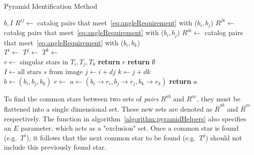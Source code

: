 \begin{algorithm}
    \caption{Pyramid Identification Method} \label{algorithm:pyramidIdentification}
    \begin{algorithmic}[1]
         {$b, I$}
        \State $R^{ij} \gets$ catalog pairs that meet~\eqref{eq:angleRequirement} with ($b_i, b_j$)
        \State $R^{jk} \gets$ catalog pairs that meet~\eqref{eq:angleRequirement} with ($b_i, b_j$)
        \State $R^{ik} \gets$ catalog pairs that meet~\eqref{eq:angleRequirement} with ($b_i, b_k$)
        \\
        \State $T^i \gets $ 
        \State $T^j \gets $ 
        \State $T^k \gets $ 
        \\
        \State $r \gets $ singular stars in $T_i, T_j, T_k$
        \State \textbf{return} $r$
        \Else
        \State \textbf{return} $\emptyset$
        \EndIf
        \EndIf
        \EndFunction
        \\
        \State $I \gets \text{all stars } s \text{ from image}$
        \State $j \gets i + dj$
        \State $k \gets j + dk$
        \\
        \State $b \gets (b_i, b_j, b_k)$
        \State $r \gets$ 
        \State $a \gets (b_i \rightarrow r_i, b_j \rightarrow r_j, b_k \rightarrow r_k)$
        \State \textbf{return} $a$
        \EndIf
        \EndFor
        \EndFor
        \EndFor
        \EndProcedure
    \end{algorithmic}
\end{algorithm}

To find the common stars between two sets of \textit{pairs} $R^{ab}$ and $R^{ac}$, they must be flattened into a single
dimensional set. These new sets are denoted as $\bar{R}^{ab}$ and $\bar{R}^{ac}$ respectively. The function
 in algorithm~\autoref{algorithm:pyramidHelpers} also specifies an $E$ parameter,
which acts as a "exclusion" set. Once a common star is found (e.g.\ $T^i$), it follows that the next common star to be
found (e.g.\ $T^j$) should not include this previously found star.

